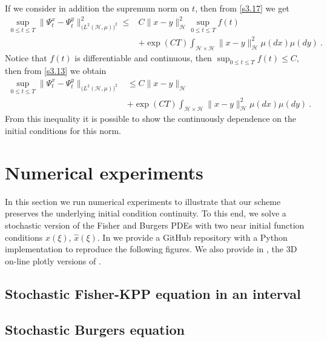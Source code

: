 \documentclass[review, onefignum, onetabnum]{siamart171218}
\begin{document}
\begin{remark}
    If we consider in addition the supremum norm on $t$, then from
    \eqref{s3.17} we get
    \begin{equation}
        \label{s3.13}
        \begin{aligned}
            \sup_{0\le t\le T}\| \Psi_t^x-\Psi_t^y\|_{
                \big(L^2(\mathcal{H},\mu) \big)^2} ^ 2
                \le&
                 C \| x-y\|_{\mathcal{H}}^2
                 \sup_{0\le t\le T} f(t)
                 \\
                 &+
                \exp(CT)
                \int_{\mathcal{H}\times \mathcal{H}}
                \|x-y\|_{\mathcal{H}}^2 \mu(dx)\mu(dy) \ .
        \end{aligned}
    \end{equation}
    Notice that $f(t)$ is differentiable and continuous, then
    $\sup_{0\le t\le T} f(t)\le C$, then from \eqref{s3.13} we obtain
    \begin{equation}
        \label{s3.14}
        \begin{aligned}
            \sup_{0\le t\le T}
            \|
                \Psi_t^x-\Psi_t^y
            \|_{\big(L^2(\mathcal{H},\mu)\big)^2}
            &\le
            C \| x-y\|_{\mathcal{H}}
            \\
            & +
            \exp(CT)
            \int_{\mathcal{H}\times \mathcal{H}}
            \| x-y\|_{\mathcal{H}}^2 \mu(dx)\mu(dy) \ .
        \end{aligned}
    \end{equation}
    From this inequality it is possible to show the continuously dependence on
    the initial conditions for this norm.
\end{remark}

\section{Numerical experiments}
    \label{sec:NumericalExperiments}
        In this section we run numerical experiments to illustrate that our
    scheme preserves the underlying initial condition continuity. To 
    this end, we solve  a stochastic version of the  Fisher and Burgers PDEs 
    with two near initial function conditions $x(\xi)$, 
    $\widehat{x}(\xi)$. In \cite{matsumyaRepo} we provide a GitHub repository 
    with a Python implementation to reproduce the following figures. We also 
    provide in \cite{plotlyFisher, plotlyBurgers}, the 3D on-line plotly 
    versions of .
%
    \subsection*{Stochastic Fisher-KPP equation in an interval}
        
    \subsection*{Stochastic Burgers equation}
        
    
    
\end{document}
